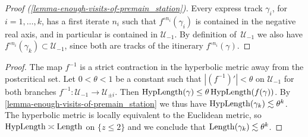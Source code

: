 \begin{proof}[Proof (\cref{lemma-enough-visits-of-premain_station})]
Every express track $\gamma_i$, for $i = 1, \ldots, k$, has a first iterate $n_i$ such that $f^{\circ n_i}(\gamma_i)$ is contained in the negative real axis, and in particular is contained in $\mathcal U_{-1}$. By definition of $\,\mathcal U_{-1}$ we also have $f^{\circ n_i}(\gamma_k) \subset \mathcal U_{-1}$, since both are tracks of the itinerary $f^{\circ n_i}(\gamma)$.
\end{proof}
\begin{proof}
The map $f^{-1}$ is a strict contraction in the hyperbolic metric away from the postcritical set. 
Let $0<\theta<1$ be a constant such that $|(f^{-1})'| < \theta$ 
on $\mathcal U_{-1}$ for both branches $f^{-1}: \mathcal U_{-1} \to \mathcal U_{\pm i}$. Then $\operatorname{HypLength}(\gamma) \leq \theta \operatorname{HypLength}(f(\gamma))$. 
By \cref{lemma-enough-visits-of-premain_station} we thus have $\operatorname{HypLength}(\gamma_k) \lesssim \theta^k$. 
The hyperbolic metric is locally equivalent to the Euclidean metric, so $\operatorname{HypLength} \asymp \operatorname{Length}$ on $\{ z \leq 2\}$ and we conclude that $\operatorname{Length}(\gamma_k) \lesssim \theta^k$.
\end{proof}


